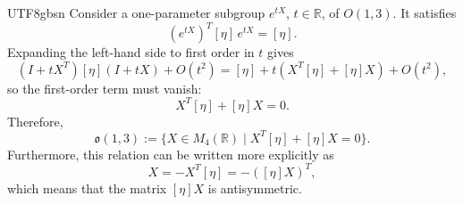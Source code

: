 \documentclass[11pt,a4paper,oneside]{report}
\begin{document}
\begin{CJK*}{UTF8}{gbsn}
Consider a one-parameter subgroup $e^{tX}$, $t\in\mathbb R$, of $O(1,3)$. It satisfies
\begin{equation*}
(e^{tX})^T[\eta]\,e^{tX}=[\eta].
\tag{B.29}\label{eq:B.29}
\end{equation*}
Expanding the left-hand side to first order in $t$ gives
\begin{equation*}
(I+tX^T)[\eta](I+tX)+O(t^2)=[\eta]+t\left(X^T[\eta]+[\eta]X\right)+O(t^2),
\tag{B.30}\label{eq:B.30}
\end{equation*}
so the first-order term must vanish:
\begin{equation*}
X^T[\eta]+[\eta]X=0.
\tag{B.31}\label{eq:B.31}
\end{equation*}
Therefore,
\begin{equation*}
\mathfrak o(1,3):=\{X\in M_4(\mathbb R)\mid X^T[\eta]+[\eta]X=0\}.
\tag{B.32}\label{eq:B.32}
\end{equation*}
Furthermore, this relation can be written more explicitly as
\begin{equation*}
[\eta]X=-X^T[\eta]=-([\eta]X)^T,
\tag{B.33}\label{eq:B.33}
\end{equation*}
which means that the matrix $[\eta]X$ is antisymmetric.


\end{CJK*}
\end{document}

